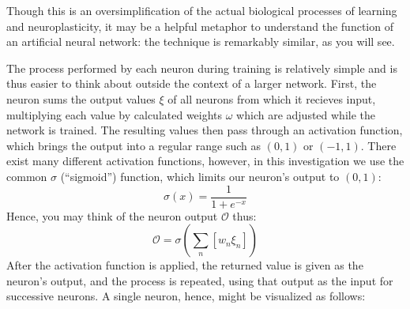 \documentclass{article}
\begin{document}
Though this is an oversimplification of the actual biological processes of learning and neuroplasticity, it may be a helpful metaphor to understand the function of an artificial neural network: the technique is remarkably similar, as you will see.

The process performed by each neuron during training is relatively simple and is thus easier to think about outside the context of a larger network. First, the neuron sums the output values $\xi$ of all neurons from which it recieves input, multiplying each value by calculated weights $\omega$ which are adjusted while the network is trained. The resulting values then pass through an activation function, which brings the output into a regular range such as $(0, 1)$ or $(-1, 1)$. There exist many different activation functions, however, in this investigation we use the common $\sigma$ (``sigmoid'') function, which limits our neuron's output to $(0, 1)$:
$$\sigma(x)=\frac{1}{1+e^{-x}}$$
Hence, you may think of the neuron output $\mathcal{O}$ thus:
$$\mathcal{O}=\sigma(\sum_n[w_{n}\xi_{n}])$$
After the activation function is applied, the returned value is given as the neuron's output, and the process is repeated, using that output as the input for successive neurons. A single neuron, hence, might be visualized as follows:

\begin{center}
\end{center}
\end{document}
